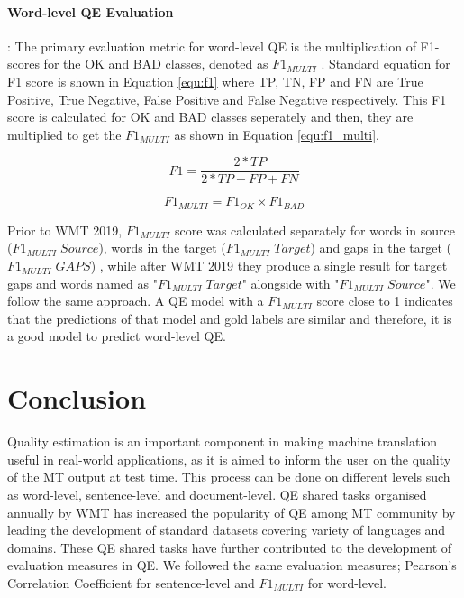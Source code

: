 \paragraph{Word-level QE Evaluation} : The primary evaluation metric for word-level QE is the multiplication of F1-scores for the OK and BAD classes, denoted as $F1_{\textit{MULTI}}$ \cite{specia-etal-2018-findings,fonseca-etal-2019-findings,specia-etal-2020-findings-wmt}. Standard equation for F1 score is shown in Equation \ref{equ:f1} where TP, TN, FP and FN are True Positive, True Negative, False Positive and False Negative respectively. This F1 score is calculated for OK and BAD classes seperately and then, they are multiplied to get the $F1_{\textit{MULTI}}$ as shown in Equation \ref{equ:f1_multi}. 

\begin{equation}
\label{equ:f1}
	F1 = \frac{2*TP}{2*TP+FP+FN}
\end{equation}


\begin{equation}
	\label{equ:f1_multi}
	F1_{\textit{MULTI}} = F1_{\textit{OK}} \times F1_{\textit{BAD}}
\end{equation}

Prior to WMT 2019, $F1_{\textit{MULTI}}$ score was calculated separately for words in source ($F1_{\textit{MULTI}} \; Source$), words in the target ($F1_{\textit{MULTI}} \; Target$) and gaps in the target ($F1_{\textit{MULTI}} \; GAPS$) \cite{specia-etal-2018-findings}, while after WMT 2019 \cite{fonseca-etal-2019-findings,specia-etal-2020-findings-wmt} they produce a single result for target gaps and words named as "$F1_{\textit{MULTI}} \; Target$" alongside with "$F1_{\textit{MULTI}} \; Source$". We follow the same approach.  A QE model with a $F1_{\textit{MULTI}}$ score close to 1 indicates that the predictions of that model and gold labels are similar and therefore, it is a good model to predict word-level QE.   

\section{Conclusion}
\label{sec:qe_conclusion}
Quality estimation is an important component in making machine translation useful in real-world applications, as it is aimed to inform the user on the quality of the MT output at test time. This process can be done on different levels such as word-level, sentence-level and document-level. QE shared tasks organised annually by WMT has increased the popularity of QE among MT community by leading the development of standard datasets covering variety of languages and domains. These QE shared tasks have further contributed to the development of evaluation measures in QE.  We followed the same evaluation measures; Pearson's Correlation Coefficient for sentence-level and $F1_{\textit{MULTI}}$ for word-level.


